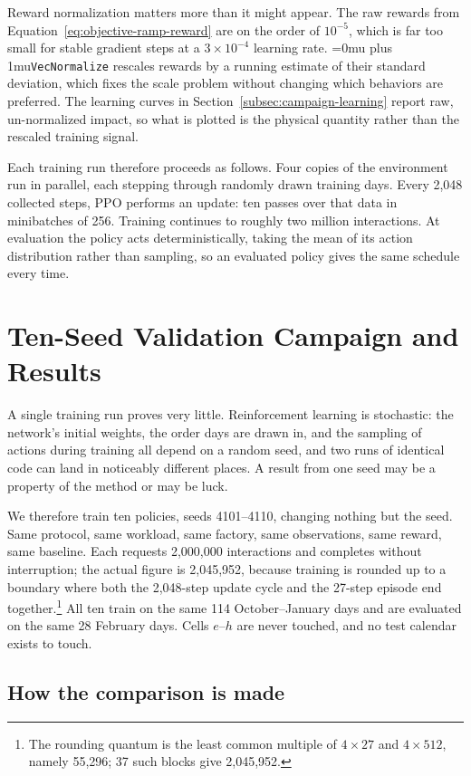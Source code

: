 ﻿\documentclass[12pt]{article}
\newcommand{\codepath}[1]{{\Urlmuskip=0mu plus 1mu\relax\nolinkurl{#1}}}
\begin{document}
Reward normalization matters more than it might appear. The raw rewards from
Equation~\eqref{eq:objective-ramp-reward} are on the order of \(10^{-5}\), which
is far too small for stable gradient steps at a \(3\times10^{-4}\) learning rate.
\codepath{VecNormalize} rescales rewards by a running estimate of their standard
deviation, which fixes the scale problem without changing which behaviors are
preferred. The learning curves in Section~\ref{subsec:campaign-learning} report
raw, un-normalized impact, so what is plotted is the physical quantity rather
than the rescaled training signal.

Each training run therefore proceeds as follows. Four copies of the environment
run in parallel, each stepping through randomly drawn training days. Every 2,048
collected steps, PPO performs an update: ten passes over that data in minibatches
of 256. Training continues to roughly two million interactions. At evaluation the
policy acts deterministically, taking the mean of its action distribution rather
than sampling, so an evaluated policy gives the same schedule every time.

\section{Ten-Seed Validation Campaign and Results}
\label{sec:campaign}

A single training run proves very little. Reinforcement learning is stochastic:
the network's initial weights, the order days are drawn in, and the sampling of
actions during training all depend on a random seed, and two runs of identical
code can land in noticeably different places. A result from one seed may be a
property of the method or may be luck.

We therefore train ten policies, seeds 4101--4110, changing nothing but the
seed. Same protocol, same workload, same factory, same observations, same
reward, same baseline. Each requests 2,000,000 interactions and completes
without interruption; the actual figure is 2,045,952, because training is
rounded up to a boundary where both the 2,048-step update cycle and the
27-step episode end together.\footnote{The rounding quantum is the least common
multiple of \(4\times27\) and \(4\times512\), namely 55,296; 37 such blocks give
2,045,952.} All ten train on the same 114 October--January days and are
evaluated on the same 28 February days. Cells \(e\)--\(h\) are never touched, and
no test calendar exists to touch.

\subsection{How the comparison is made}
\label{subsec:campaign-statistics}
\end{document}
